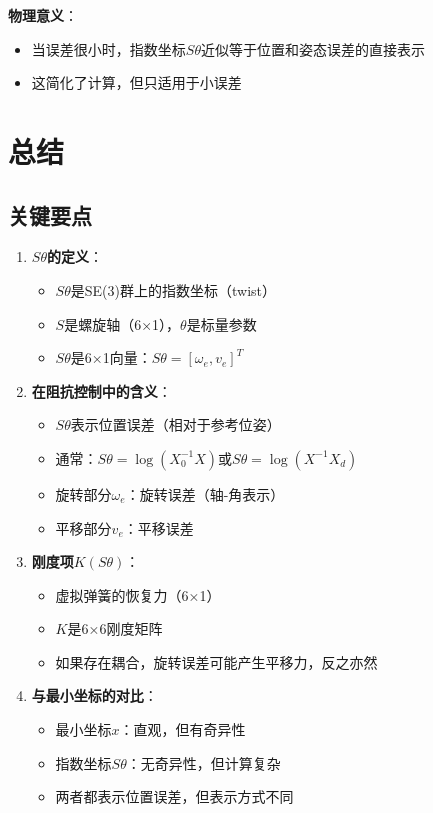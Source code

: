 \documentclass[12pt,a4paper]{article}
\begin{document}
\textbf{物理意义}：
\begin{itemize}
\item 当误差很小时，指数坐标$S\theta$近似等于位置和姿态误差的直接表示
\item 这简化了计算，但只适用于小误差
\end{itemize}

\section{总结}

\subsection{关键要点}

\begin{enumerate}
\item \textbf{$S\theta$的定义}：
\begin{itemize}
\item $S\theta$是SE(3)群上的指数坐标（twist）
\item $S$是螺旋轴（6×1），$\theta$是标量参数
\item $S\theta$是6×1向量：$S\theta = [\omega_e, v_e]^T$
\end{itemize}

\item \textbf{在阻抗控制中的含义}：
\begin{itemize}
\item $S\theta$表示位置误差（相对于参考位姿）
\item 通常：$S\theta = \log(X_0^{-1} X)$或$S\theta = \log(X^{-1} X_d)$
\item 旋转部分$\omega_e$：旋转误差（轴-角表示）
\item 平移部分$v_e$：平移误差
\end{itemize}

\item \textbf{刚度项$K(S\theta)$}：
\begin{itemize}
\item 虚拟弹簧的恢复力（6×1）
\item $K$是6×6刚度矩阵
\item 如果存在耦合，旋转误差可能产生平移力，反之亦然
\end{itemize}

\item \textbf{与最小坐标的对比}：
\begin{itemize}
\item 最小坐标$x$：直观，但有奇异性
\item 指数坐标$S\theta$：无奇异性，但计算复杂
\item 两者都表示位置误差，但表示方式不同
\end{itemize}
\end{enumerate}
\end{document}
